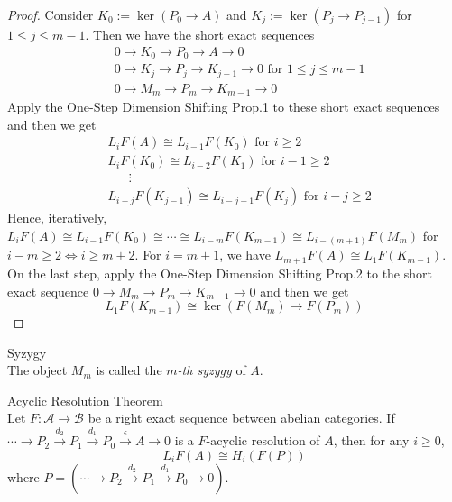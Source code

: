 \begin{proof}
    Consider $K_0:= \ker(P_0\to A)$ and $K_j:=\ker (P_j\to P_{j-1})$ for $1\leq j\leq m-1$. Then we have the short exact sequences
    \begin{align*}
        &0\to K_0\to P_0 \to A\to0\\
        &0\to K_j\to P_j\to K_{j-1}\to0 \text{ for } 1\leq j\leq m-1\\
        &0\to M_m\to P_m\to K_{m-1}\to 0
    \end{align*}
    Apply the One-Step Dimension Shifting Prop.1 to these short exact sequences and then we get
    \begin{align*}
        &L_iF(A) \cong L_{i-1}F(K_0) \text{ for } i\geq 2\\
        &L_iF(K_0) \cong L_{i-2}F(K_1) \text{ for } i-1\geq 2\\
        & \;\;\;\;\;\;\vdots\\
        &L_{i-j} F(K_{j-1}) \cong L_{i-j-1} F(K_j) \text{ for } i-j\geq 2
    \end{align*}
    Hence, iteratively, $L_iF(A) \cong L_{i-1} F(K_0) \cong \cdots \cong L_{i-m} F(K_{m-1}) \cong L_{i-(m+1)} F(M_m)$ for $i-m\geq 2 \Leftrightarrow i\geq m+2$. For $i=m+1$, we have $L_{m+1} F(A) \cong L_1F(K_{m-1})$. On the last step, apply the One-Step Dimension Shifting Prop.2 to the short exact sequence $0\to M_m\to P_m \to K_{m-1}\to 0$ and then we get
    \[
    L_1F(K_{m-1}) \cong \ker (F(M_m) \to F(P_m))
    \]
\end{proof}

\begin{definition}{Syzygy}\\
The object $M_m$ is called the \textit{$m$-th syzygy} of $A$.
\end{definition}

\begin{theorem}{Acyclic Resolution Theorem}\\
Let $F:\mathcal{A} \to \mathcal{B}$ be a right exact sequence between abelian categories. If $\cdots \to P_2\xrightarrow{d_2} P_1 \xrightarrow{d_1} P_0\xrightarrow{\epsilon} A\to0$ is a $F$-acyclic resolution of $A$, then for any $i\geq 0$,
\[
L_iF(A) \cong H_i (F(P))
\]
where $P=(\cdots \to P_2\xrightarrow{d_2} P_1 \xrightarrow{d_1} P_0 \to0)$.
\end{theorem}


